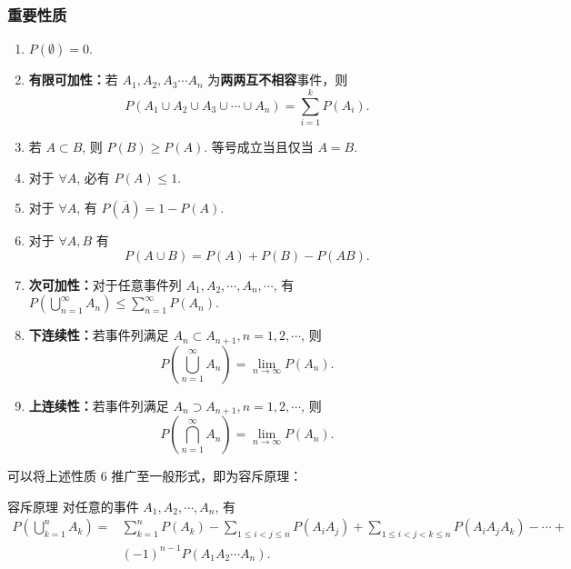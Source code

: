 \documentclass[12pt, a4paper, oneside, UTF8]{ctexbook}
\begin{document}
\subsubsection{重要性质}
\begin{enumerate}
    \item \(P\left(\emptyset\right) = 0\).
    \item \textbf{有限可加性：}若 \(A_1 , A_2 , A_3 \cdots A_n\) 为\textbf{两两互不相容}事件，则\[P\left(A_1\cup A_2 \cup A_3 \cup \cdots \cup A_n\right) = \sum_{i = 1}^{k} P\left(A_i\right).\]
    \item 若 \(A \subset B\), 则 \(P\left(B\right) \geqslant P\left(A\right)\). 等号成立当且仅当 \(A = B\).
    \item 对于 \(\forall A\), 必有 \(P\left(A\right) \leqslant 1\).
    \item 对于 \(\forall A\), 有 \(P\left(\overline{A}\right) = 1 - P\left(A\right)\).
    \item 对于 \(\forall A, B\) 有\[P\left(A\cup B\right) = P\left(A\right) + P\left(B\right) - P\left(AB\right).\]
    \item \textbf{次可加性：}对于任意事件列 \(A_1 , A_2 , \cdots , A_n , \cdots\), 有 \(P\left(\bigcup_{n = 1}^{\infty} A_n\right) \leqslant \sum_{n = 1}^{\infty} P\left(A_n\right)\).
    \item \textbf{下连续性：}若事件列满足 \(A_n \subset A_{n+1} , n = 1 , 2 , \cdots\), 则\[P\left(\bigcup_{n = 1}^{\infty} A_n\right) = \lim_{n \rightarrow \infty} P\left(A_n\right).\]
    \item \textbf{上连续性：}若事件列满足 \(A_n \supset A_{n+1} , n = 1 , 2 , \cdots\), 则\[P\left(\bigcap_{n = 1}^{\infty} A_n\right) = \lim_{n \rightarrow \infty} P\left(A_n\right).\]
\end{enumerate}

可以将上述性质 \(6\) 推广至一般形式，即为容斥原理：

\begin{thm}{容斥原理}
    对任意的事件 \(A_1 , A_2 , \cdots , A_n\), 有
    \begin{align*}
        P\left(\bigcup^{n}_{k = 1} A_k\right) = &\sum_{k = 1}^{n}P\left(A_k\right) - \sum_{1 \leqslant i < j \leqslant n} P\left(A_i A_j\right) + \sum_{1 \leqslant i < j < k \leqslant n} P\left(A_i A_j A_k\right) - \cdots + \\ &\left(-1\right)^{n-1}P\left(A_1 A_2 \cdots A_n\right).
    \end{align*}
\end{thm}
\end{document}
